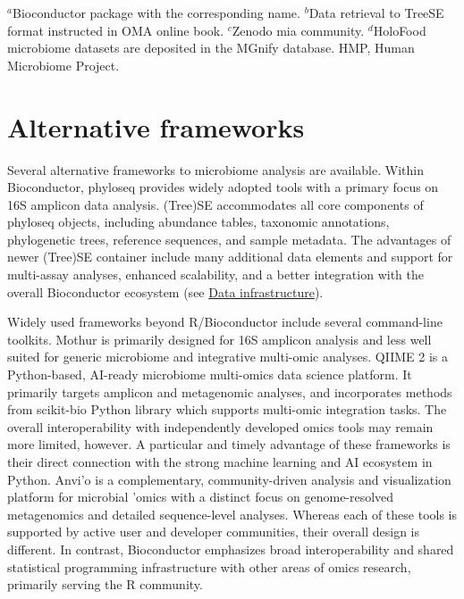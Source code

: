 \documentclass[
  sn-nature,
]{sn-jnl}
\begin{document}
\(^a\)Bioconductor package with the corresponding name. \(^b\)Data
retrieval to TreeSE format instructed in OMA online book. \(^c\)Zenodo
mia community. \(^d\)HoloFood microbiome datasets are deposited in the
MGnify database. HMP, Human Microbiome Project.

\section{Alternative frameworks}\label{sec-data_frameworks}

Several alternative frameworks to microbiome analysis are available.
Within Bioconductor, phyloseq \citep{mcmurdie2012} provides widely
adopted tools with a primary focus on 16S amplicon data analysis.
(Tree)SE accommodates all core components of phyloseq objects, including
abundance tables, taxonomic annotations, phylogenetic trees, reference
sequences, and sample metadata. The advantages of newer (Tree)SE
container include many additional data elements and support for
multi-assay analyses, enhanced scalability, and a better integration
with the overall Bioconductor ecosystem (see \hyperref[sec-infra]{Data
infrastructure}).

Widely used frameworks beyond R/Bioconductor include several
command-line toolkits. Mothur \citep{schloss2009} is primarily designed
for 16S amplicon analysis and less well suited for generic microbiome
and integrative multi-omic analyses. QIIME 2 \citep{bolyen2019} is a
Python-based, AI-ready microbiome multi-omics data science platform. It
primarily targets amplicon and metagenomic analyses, and incorporates
methods from scikit-bio Python library \citep{aton2026} which supports
multi-omic integration tasks. The overall interoperability with
independently developed omics tools may remain more limited, however. A
particular and timely advantage of these frameworks is their direct
connection with the strong machine learning and AI ecosystem in Python.
Anvi'o \citep{eren2021} is a complementary, community-driven analysis
and visualization platform for microbial 'omics with a distinct focus on
genome-resolved metagenomics and detailed sequence-level analyses.
Whereas each of these tools is supported by active user and developer
communities, their overall design is different. In contrast,
Bioconductor emphasizes broad interoperability and shared statistical
programming infrastructure with other areas of omics research, primarily
serving the R community.
\end{document}
